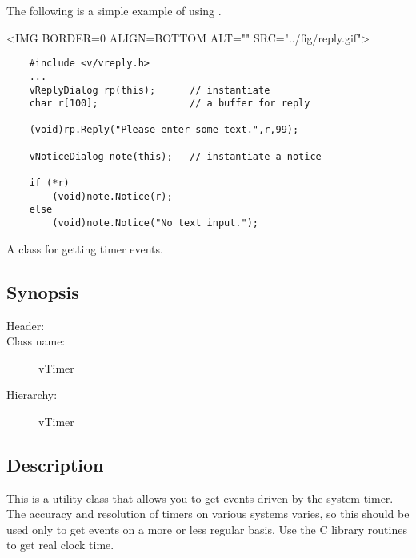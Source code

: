 The following is a simple example of using .

\vspace{.1in}
\small
\begin{rawhtml}
<IMG BORDER=0 ALIGN=BOTTOM ALT="" SRC="../fig/reply.gif">
\end{rawhtml}
\begin{latexonly}

\end{latexonly}
\normalfont\normalsize

\footnotesize
\begin{verbatim}
    #include <v/vreply.h>
    ...
    vReplyDialog rp(this);      // instantiate
    char r[100];                // a buffer for reply

    (void)rp.Reply("Please enter some text.",r,99);

    vNoticeDialog note(this);   // instantiate a notice

    if (*r)
        (void)note.Notice(r);
    else
        (void)note.Notice("No text input.");
\end{verbatim}
\normalfont\normalsize



A class for getting timer events.

\subsection* {Synopsis}

\begin{description}
	\item [Header:] 
	\item [Class name:] vTimer
 	\item [Hierarchy:] vTimer
\end{description}

\subsection* {Description}

This is a utility class that allows you to get events driven
by the system timer. The accuracy and resolution of timers on
various systems varies, so this should be used only to get
events on a more or less regular basis. Use the C library 
routines to get real clock time.

